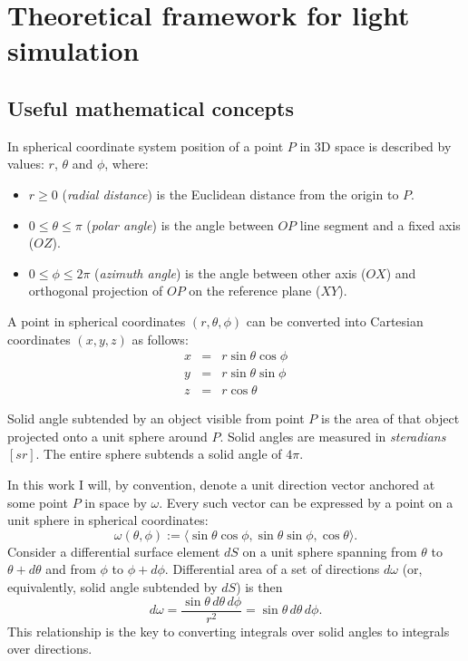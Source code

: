 \chapter{Theoretical framework for light simulation}
\label{ch:theory}

\section{Useful mathematical concepts}

\begin{df}
In spherical coordinate system position of a point $P$ in 3D space is described by values: $r$, $\theta$ and $\phi$, where:
\begin{itemize}
\item $r \geq 0$ (\emph{radial distance}) is the Euclidean distance from the origin to $P$.
\item $0 \leq \theta \leq \pi$ (\emph{polar angle}) is the angle between $OP$ line segment and a fixed axis ($OZ$).
\item $0 \leq \phi \leq 2\pi$ (\emph{azimuth angle}) is the angle between other axis ($OX$) and orthogonal projection of $OP$ on the reference plane ($XY$).
\end{itemize}
A point in spherical coordinates $(r, \theta, \phi)$ can be converted into Cartesian coordinates $(x, y, z)$ as follows:
\begin{eqnarray}
  x &=& r \sin \theta \cos \phi \nonumber \\
  y &=& r \sin \theta \sin \phi \\
  z &=& r \cos \theta \nonumber
\end{eqnarray}
\end{df}

\begin{df}
Solid angle subtended by an object visible from point $P$ is the area of that object projected onto a unit sphere around $P$. Solid angles are measured in \emph{steradians} $[sr]$. The entire sphere subtends a solid angle of $4\pi$.
\end{df}

In this work I will, by convention, denote a unit direction vector anchored at some point $P$ in space by $\omega$. Every such vector can be expressed by a point on a unit sphere in spherical coordinates:
\begin{equation}
  \omega(\theta,\phi) := \langle \sin\theta\cos\phi, \sin\theta\sin\phi, \cos\theta \rangle.
\end{equation}
Consider a differential surface element $dS$ on a unit sphere spanning from $\theta$ to $\theta + d\theta$ and from $\phi$ to $\phi + d\phi$. Differential area of a set of directions $d\omega$ (or, equivalently, solid angle subtended by $dS$) is then
\begin{equation}
\label{eq:dw2spherical}
  d\omega = \frac{\sin\theta \,d\theta \,d\phi}{r^{2}} = \sin\theta \,d\theta \,d\phi.
\end{equation}
This relationship is the key to converting integrals over solid angles to integrals over directions.

